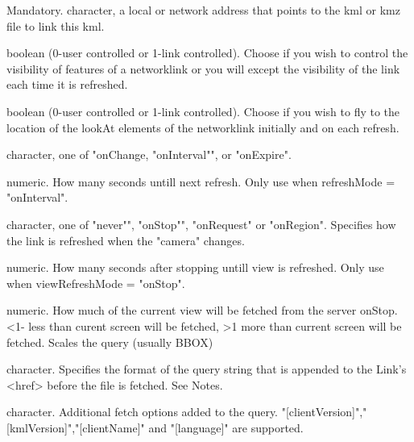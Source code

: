 \documentclass[a4paper]{book}
\begin{document}
\begin{Arguments}
\begin{ldescription}

\item[\code{href}] Mandatory. character, a local or network address that points to the kml or kmz file to link this kml.

\item[\code{refreshVisibility}] boolean (0-user controlled or 1-link controlled). Choose if you wish to control the visibility of features of a networklink or you will except the visibility of the link each time it is refreshed.
\item[\code{flToView}] boolean (0-user controlled or 1-link controlled). Choose if you wish to fly to the location of the lookAt elements of the networklink initially and on each refresh.
\item[\code{refreshMode}] character, one of "onChange, "onInterval"", or "onExpire".
\item[\code{refreshInterval}] numeric. How many seconds untill next refresh. Only use when refreshMode = "onInterval".
\item[\code{viewRefreshMode}] character, one of "never"", "onStop"", "onRequest" or "onRegion". Specifies how the link is refreshed when the "camera" changes.
\item[\code{viewRefreshTime}] numeric. How many seconds after stopping untill view is refreshed. Only use when viewRefreshMode = "onStop".
\item[\code{viewBoundScale}] numeric. How much of the current view will be fetched from the server onStop. <1- less than curent screen will be fetched, >1 more than current screen will be fetched. Scales the query (usually BBOX) 
\item[\code{viewFormat}] character. Specifies the format of the query string that is appended to the Link's <href> before the file is fetched. See Notes. 
\item[\code{httpQuery}] character. Additional fetch options added to the query. "[clientVersion]","[kmlVersion]","[clientName]" and "[language]" are supported. 


\end{ldescription}
\end{Arguments}
\end{document}

